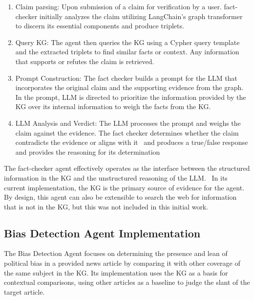 \documentclass[11pt]{article}
\begin{document}
\begin{enumerate}

    \item Claim parsing: Upon submission of a claim for verification by a user. fact-checker initially analyzes the claim utilizing LangChain’s graph transformer to discern its essential components and produce triplets.
    
    \item Query KG: The agent then queries the KG using a Cypher query template and the extracted triplets to find similar facts or context. Any information that supports or refutes the claim is retrieved.
    
    \item Prompt Construction: The fact checker builds a prompt for the LLM that incorporates the original claim and the supporting evidence from the graph. In the prompt, LLM is directed to prioritize the information provided by the KG over its internal information to weigh the facts from the KG.
    
    \item LLM Analysis and Verdict: The LLM processes the prompt and weighs the claim against the evidence. The fact checker determines whether the claim contradicts the evidence or aligns with it  and produces a true/false response and provides the reasoning for its determination
 

\end{enumerate}

The fact-checker agent effectively operates as the interface between the structured information in the KG and the unstructured reasoning of the LLM.  In its current implementation, the KG is the primary source of evidence for the agent. By design, this agent can also be extensible to search the web for information that is not in the KG, but this was not included in this initial work. 

\subsection{Bias Detection Agent Implementation}
The Bias Detection Agent focuses on determining the presence and lean of political bias in a provided news article by comparing it with other coverage of the same subject in the KG. Its implementation uses the KG as a basis for contextual comparisons, using other articles as a baseline to judge the slant of the target article.
\end{document}
